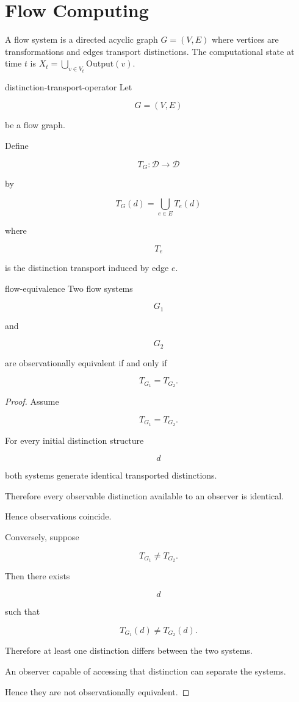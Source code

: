 \documentclass[12pt,twoside,openright]{book}
\begin{document}
\section{Flow Computing}

A flow system is a directed acyclic graph $G = (V,E)$
where vertices are transformations and edges transport
distinctions.
The computational state at time $t$ is
$X_t = \bigcup_{v \in V_t}\mathrm{Output}(v)$.

\begin{definition}{distinction-transport-operator}
Let

\[
G=(V,E)
\]

be a flow graph.

Define

\[
T_G :
\mathcal D
\rightarrow
\mathcal D
\]

by

\[
T_G(d)
=
\bigcup_{e\in E}
T_e(d)
\]

where

\[
T_e
\]

is the distinction transport induced by edge \(e\).
\end{definition}

\begin{theorem}{flow-equivalence}
Two flow systems

\[
G_1
\]

and

\[
G_2
\]

are observationally equivalent if and only if

\[
T_{G_1}
=
T_{G_2}.
\]
\end{theorem}

\begin{proof}
Assume

\[
T_{G_1}
=
T_{G_2}.
\]

For every initial distinction structure

\[
d
\]

both systems generate identical transported
distinctions.

Therefore every observable distinction available to an
observer is identical.

Hence observations coincide.

Conversely, suppose

\[
T_{G_1}
\neq
T_{G_2}.
\]

Then there exists

\[
d
\]

such that

\[
T_{G_1}(d)
\neq
T_{G_2}(d).
\]

Therefore at least one distinction differs between the
two systems.

An observer capable of accessing that distinction can
separate the systems.

Hence they are not observationally equivalent.
\end{proof}
\end{document}
